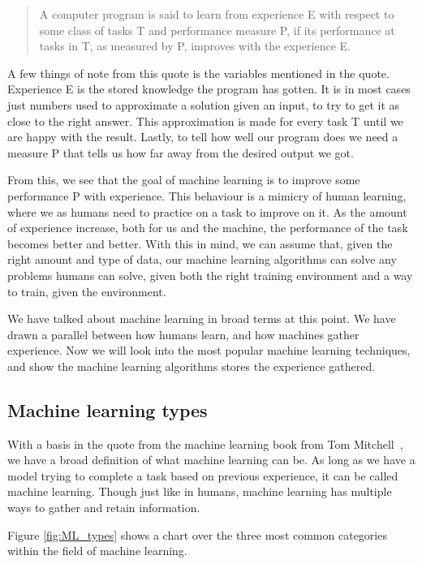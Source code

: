 \begin{quote}
 A computer program is said to learn from experience E with respect to some class of tasks T and performance measure P, if its performance at tasks in T, as measured by P, improves with the experience E. \cite{MitchellTomM1997Ml}

\end{quote} 
\label{ML}


\vspace{10px}
A few things of note from this quote is the variables mentioned in the quote. Experience E is the stored knowledge the program has gotten. It is in most cases just numbers used to approximate a solution given an input, to try to get it as close to the right answer. This approximation is made for every task T until we are happy with the result.
Lastly, to tell how well our program does we need a measure P that tells us how far away from the desired output we got.
   
From this, we see that the goal of machine learning is to improve some performance P with experience. This behaviour is a mimicry of human learning, where we as humans need to practice on a task to improve on it.
As the amount of experience increase, both for us and the machine, the performance of the task becomes better and better. With this in mind, we can assume that, given the right amount and type of data, our machine learning algorithms can solve any problems humans can solve, given both the right training environment and a way to train, given the environment.

We have talked about machine learning in broad terms at this point. We have drawn a parallel between how humans learn, and how machines gather experience.  Now we will look into the most popular machine learning techniques, and show the machine learning algorithms stores the experience gathered.
 
\subsection{Machine learning types}
With a basis in the quote from the machine learning book from Tom Mitchell~\cite{MitchellTomM1997Ml}, we have a broad definition of what machine learning can be.
As long as we have a model trying to complete a task based on previous experience, it can be called machine learning. Though just like in humans, machine learning has multiple ways to gather and retain information.

Figure \ref{fig:ML_types} shows a chart over the three most common categories within the field of machine learning. 

